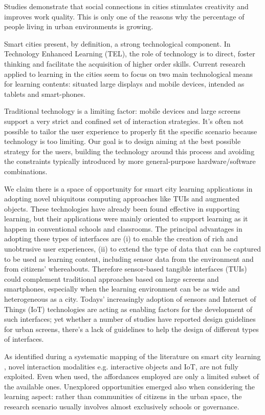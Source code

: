 Studies demonstrate that social connections in cities stimulates creativity and improves work quality\cite{florida_cities_2005}. This is only one of the reasons why the percentage of people living in urban environments is growing.

Smart cities present, by definition, a strong technological component.
In Technology Enhanced Learning (TEL), the role of technology is to direct, foster thinking and facilitate the acquisition of higher order skills\cite{goodyear_technologyenhanced_2010}.
Current research applied to learning in the cities seem to focus on two main technological means for learning contents: situated large displays and mobile devices, intended as tablets and smart-phones\cite{luff_mobility_1998}.

Traditional technology is a limiting factor: mobile devices and large screens support a very strict and confined set of interaction strategies. It's often not possible to tailor the user experience to properly fit the specific scenario because technology is too limiting.
Our goal is to design aiming at the best possible strategy for the users, building the technology around this process and avoiding the constraints typically introduced by more general-purpose hardware/software combinations.

We claim there is a space of opportunity for smart city learning applications in adopting novel ubiquitous computing approaches like TUIs and augmented objects. These technologies have already been found effective in supporting learning\cite{stanton_classroom_2001}, but their applications were mainly oriented to support learning as it happen in conventional schools and classrooms. The principal advantages in adopting these types of interfaces are (i) to enable the creation of rich and unobtrusive user experiences, (ii) to extend the type of data that can be captured to be used as learning content, including sensor data from the environment and from citizens' whereabouts. Therefore sensor-based tangible interfaces (TUIs) could complement traditional approaches based on large screens and smartphones, especially when the learning environment can be as wide and heterogeneous as a city. Todays' increasingly adoption of sensors and Internet of Things (IoT) technologies are acting as enabling factors for the development of such interfaces; yet whether a number of studies have reported design guidelines for urban screens, there's a lack of guidelines to help the design of different types of interfaces.

As identified during a systematic mapping of the literature on smart city learning \cite{gianni_technologyenhanced_2016}, novel interaction modalities e.g. interactive objects and IoT, are not fully exploited. Even when used, the affordances employed are only a limited subset of the available ones. Unexplored opportunities emerged also when considering the learning aspect: rather than communities of citizens in the urban space, the research scenario usually involves almost exclusively schools or governance.

